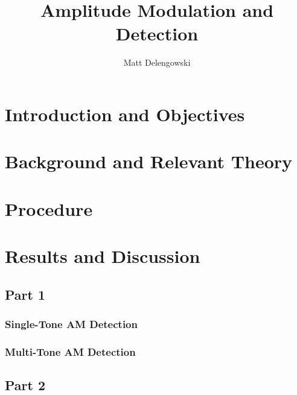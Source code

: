 \documentclass[conference]{IEEEtran}
\begin{document}
  \title{Amplitude Modulation and Detection}
  \author{
    Matt Delengowski\\
  }
  \maketitle

  \IEEEpeerreviewmaketitle

  \begin{abstract}

  \end{abstract}

  \section{Introduction and Objectives}
  \label{sec:Intro}

  \section{Background and Relevant Theory}
  \label{sec:Background}


  \section{Procedure}
  \label{sec:Procedure}


  \section{Results and Discussion}
  \label{sec:Results}

    \subsection{Part 1}

      \subsubsection{Single-Tone AM Detection}

      \subsubsection{Multi-Tone AM Detection}

    \subsection{Part 2}
\end{document}
